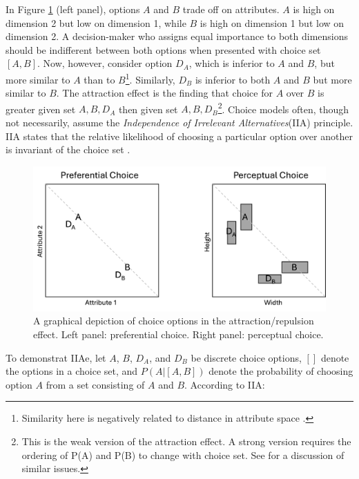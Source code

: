 In Figure \ref{fig:fig_opts} (left panel), options $A$ and $B$ trade off on attributes. $A$ is high on dimension 2 but low on dimension 1, while $B$ is high on dimension 1 but low on dimension 2. A decision-maker who assigns equal importance to both dimensions should be indifferent between both options when presented with choice set $[A,B]$. Now, however, consider option $D_{A}$, which is inferior to $A$ and $B$, but more similar to $A$ than to $B$\footnote{Similarity here is negatively related to distance in attribute space \parencite{shepardUniversalLawGeneralization1987c}.}. Similarly, $D_{B}$ is inferior to both $A$ and $B$ but more similar to $B$. The attraction effect is the finding that choice for $A$ over $B$ is greater given set ${A,B,D_{A}}$ then given set $A,B,D_{B}$\footnote{This is the weak version of the attraction effect. A strong version requires the ordering of P(A) and P(B) to change with choice set. See \textcite{davis2023illustrated} for a discussion of similar issues.}. 
Choice models often, though not necessarily, assume the \textit{Independence of Irrelevant Alternatives}(IIA) principle. IIA states that the relative likelihood of choosing a particular option over another is invariant of the choice set \parencite{ray1973independence}. 

\begin{figure}
   \includegraphics[width=\linewidth]{figures/pref_v_percep.jpg}
   \caption{A graphical depiction of choice options in the attraction/repulsion effect. Left panel: preferential choice. Right panel: perceptual choice.}
   \label{fig:fig_opts}
\end{figure}

To demonstrat IIAe, let $A$, $B$, $D_{A}$, and $D_{B}$ be discrete choice options, $[]$ denote the options in a choice set, and $P(A|[A,B])$ denote the probability of choosing option $A$ from a set consisting of $A$ and $B$. According to IIA:

